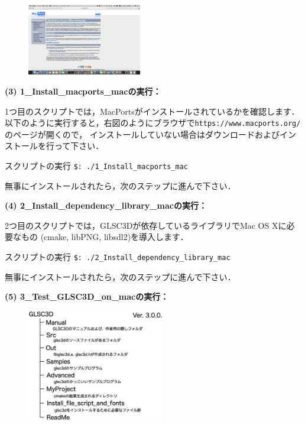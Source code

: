 \documentclass[platex,a4paper,12pt]{jsarticle}%
\begin{document}
\begin{figure}
\includegraphics[width=50mm]{./Figures/eps/Canvas_macports.eps}
\vspace{-4\baselineskip}
\end{figure}

\noindent 
{\bf (3) 1\_Install\_macports\_macの実行：} 

1つ目のスクリプトでは，MacPortsがインストールされているかを確認します．
以下のように実行すると，右図のようにブラウザで\verb|https://www.macports.org/|のページが開くので，
インストールしていない場合はダウンロードおよびインストールを行って下さい．

\begin{itembox}[l]{スクリプトの実行}
\verb|$: ./1_Install_macports_mac|
\end{itembox}

無事にインストールされたら，次のステップに進んで下さい．

\noindent 
{\bf (4) 2\_Install\_dependency\_library\_macの実行：} 

2つ目のスクリプトでは，GLSC3Dが依存しているライブラリでMac OS Xに必要なもの
(cmake, libPNG, libsdl2)を導入します．

\begin{itembox}[l]{スクリプトの実行}
\verb|$: ./2_Install_dependency_library_mac|
\end{itembox}

無事にインストールされたら，次のステップに進んで下さい．

\noindent 
{\bf (5) 3\_Test\_GLSC3D\_on\_macの実行：} 

\begin{figure}
\includegraphics[width=60mm]{./Figures/eps/Canvas_Directory_GLSC3D.eps}
\end{figure}
\end{document}

